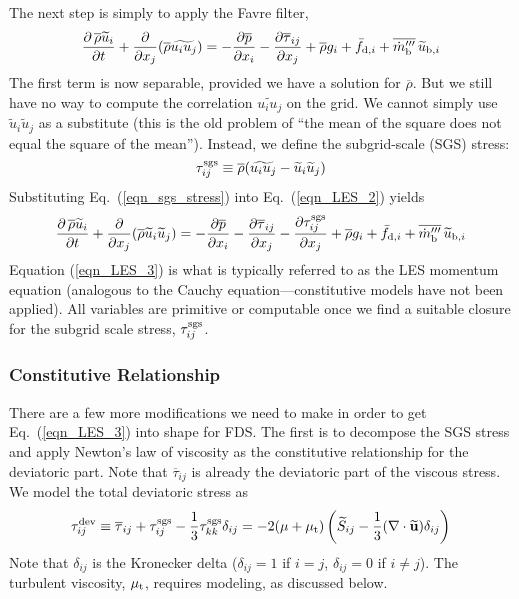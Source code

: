 The next step is simply to apply the Favre filter,
\begin{equation}
\label{eqn_LES_2}
\frac{\partial \,\overline{\rho} \widetilde{u}_i}{\partial t} + \frac{\partial}{\partial x_j} (\overline{\rho} \widetilde{u_i u_j}) = -\frac{\partial \overline{p}}{\partial x_i} - \frac{\partial \overline{\tau}_{ij}}{\partial x_j} + \overline{\rho} g_i + \bar{f}_{{\rm d},i} + \overline{\dot{m}_{\rm b}^{\prime\prime\prime}} \, \widetilde{u}_{{\rm b},i}
\end{equation}
The first term is now separable, provided we have a solution for $\overline{\rho}$. But we still have no way to compute the correlation $\widetilde{u_i u_j}$ on the grid. We cannot simply use $\widetilde{u}_i \widetilde{u}_j$ as a substitute (this is the old problem of ``the mean of the square does not equal the square of the mean''). Instead, we define the subgrid-scale (SGS) stress:
\begin{equation}
\label{eqn_sgs_stress}
\tau_{ij}^{\rm sgs} \equiv \overline{\rho} ( \widetilde{u_i u_j} - \widetilde{u}_i \widetilde{u}_j )
\end{equation}
Substituting Eq.~(\ref{eqn_sgs_stress}) into Eq.~(\ref{eqn_LES_2}) yields
\begin{equation}
\label{eqn_LES_3}
\frac{\partial \,\overline{\rho} \widetilde{u}_i}{\partial t} + \frac{\partial}{\partial x_j} (\overline{\rho} \widetilde{u}_i \widetilde{u}_j) = -\frac{\partial \overline{p}}{\partial x_i} - \frac{\partial \overline{\tau}_{ij}}{\partial x_j} - \frac{\partial \tau_{ij}^{\rm sgs}}{\partial x_j} + \overline{\rho} g_i + \bar{f}_{{\rm d},i} + \overline{\dot{m}_{\rm b}^{\prime\prime\prime}} \, \widetilde{u}_{{\rm b},i}
\end{equation}
Equation (\ref{eqn_LES_3}) is what is typically referred to as the LES momentum equation (analogous to the Cauchy equation---constitutive models have not been applied).  All variables are primitive or computable once we find a suitable closure for the subgrid scale stress, $\tau_{ij}^{\rm sgs}$.

\subsubsection*{Constitutive Relationship}

There are a few more modifications we need to make in order to get Eq.~(\ref{eqn_LES_3}) into shape for FDS.  The first is to decompose the SGS stress and apply Newton's law of viscosity as the constitutive relationship for the deviatoric part.  Note that $\overline{\tau}_{ij}$ is already the deviatoric part of the viscous stress.  We model the total deviatoric stress as
\begin{equation}
\label{eqn_newtons_law_sgs}
\tau_{ij}^{\rm dev} \equiv \overline{\tau}_{ij} + \tau_{ij}^{\rm sgs} - \frac{1}{3}\tau_{kk}^{\rm sgs}\delta_{ij} = - 2 (\mu + \mu_{\rm t}) \left(\widetilde{S}_{ij} - \frac{1}{3}(\nabla\cdot \widetilde{\mathbf{u}}) \delta_{ij} \right)
\end{equation}
Note that $\delta_{ij}$ is the Kronecker delta ($\delta_{ij}=1$ if $i=j$, $\delta_{ij}=0$ if $i\ne j$).  The turbulent viscosity, $\mu_{\rm t}$, requires modeling, as discussed below.

